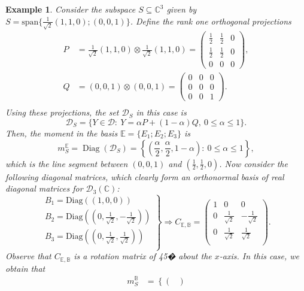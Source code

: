 \documentclass[12pt,a4paper]{article}
\def\calD{\mathcal D}
\def\C{\mathbb C}
\DeclareMathOperator{\Diag}{Diag}
\newtheorem{example}{Example}
\numberwithin{equation}{section}
\begin{document}
\begin{example}
	Consider the subspace $S\subseteq\C^3$ given by $S=\text{span}\{\frac{1}{\sqrt{2}}(1,1,0);(0,0,1)\}$. Define the rank one orthogonal projections
	\begin{align*}
		P&=\frac{1}{\sqrt{2}}(1,1,0)\otimes \frac{1}{\sqrt{2}}(1,1,0)=\begin{pmatrix}
			\frac 12&\frac 12&0\\
			\frac 12&\frac 12&0\\
			0&0&0
		\end{pmatrix},\\		
		Q&=(0,0,1)\otimes (0,0,1)=\begin{pmatrix}
			0&0&0\\
			0&0&0\\
			0&0&1
		\end{pmatrix}.\\
	\end{align*}
	Using these projections, the set $\calD_{S}$ in this case is
	\[\calD_{S}=\{Y\in \calD:\ Y=\alpha P+(1-\alpha)Q,\ 0\leq \alpha\leq 1\}.\]
	Then, the moment in the basis $\mathbb{E}=\{E_1;E_2;E_3\}$ is
	\[m_S^{\mathbb{E}}=\Diag(\calD_{S})= \left\lbrace \left( \frac{\alpha}{2}, \frac{\alpha}{2},1-\alpha\right):\ 0\leq \alpha\leq 1 \right\rbrace, \]
	which is the line segment between $(0,0,1)$ and $\left( \frac 12,\frac 12,0\right)$. Now consider the following diagonal matrices, which clearly form an orthonormal basis of real diagonal matrices for $\calD_3(\C)$:
\[\left. \begin{array}{lll}
	B_1=\text{Diag}\left( (1,0,0)\right)\\		
	B_2=\text{Diag}\left( \left(0,\frac{1}{\sqrt{2}},-\frac{1}{\sqrt{2}}\right)\right)\\
	B_3=\text{Diag}\left( \left(0,\frac{1}{\sqrt{2}},\frac{1}{\sqrt{2}}\right)\right)\\	
\end{array}\right\rbrace \Rightarrow C_{\mathbb{E},\mathbb{B}}=\begin{pmatrix}
1&0&0\\
0&\frac{1}{\sqrt{2}}&-\frac{1}{\sqrt{2}}\\
0&\frac{1}{\sqrt{2}}&\frac{1}{\sqrt{2}}\\
\end{pmatrix}.
\]
Observe that $C_{\mathbb{E},\mathbb{B}}$ is a rotation matrix of 45� about the $x$-axis. In this case, we obtain that
\begin{align*}
	m_S^{\mathbb{B}}&=\left\lbrace \begin{pmatrix}

\end{pmatrix}
\end{align*}
\end{example}
\end{document}
